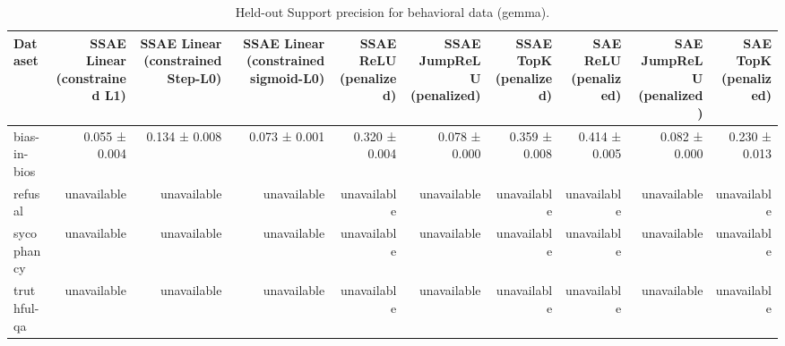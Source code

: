 \begin{table}[t]
\centering
\caption{Held-out Support precision for behavioral data (gemma).}
\label{tab:behavioral-gemma-support-precision}
\begin{tabular}{lrrrrrrrrr}
\toprule
Dataset & SSAE Linear (constrained L1) & SSAE Linear (constrained Step-L0) & SSAE Linear (constrained sigmoid-L0) & SSAE ReLU (penalized) & SSAE JumpReLU (penalized) & SSAE TopK (penalized) & SAE ReLU (penalized) & SAE JumpReLU (penalized) & SAE TopK (penalized) \\
\midrule
bias-in-bios & 0.055 ± 0.004 & 0.134 ± 0.008 & 0.073 ± 0.001 & 0.320 ± 0.004 & 0.078 ± 0.000 & 0.359 ± 0.008 & 0.414 ± 0.005 & 0.082 ± 0.000 & 0.230 ± 0.013 \\
refusal & unavailable & unavailable & unavailable & unavailable & unavailable & unavailable & unavailable & unavailable & unavailable \\
sycophancy & unavailable & unavailable & unavailable & unavailable & unavailable & unavailable & unavailable & unavailable & unavailable \\
truthful-qa & unavailable & unavailable & unavailable & unavailable & unavailable & unavailable & unavailable & unavailable & unavailable \\
\bottomrule
\end{tabular}
\end{table}
